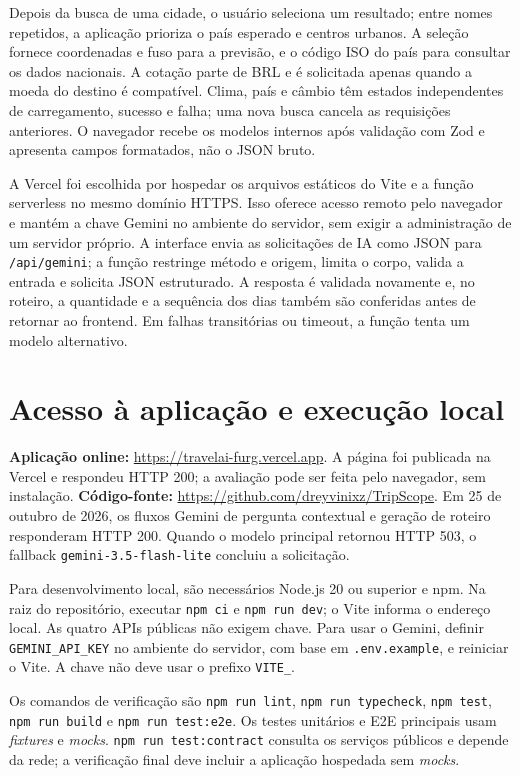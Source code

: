 \documentclass[a4paper,11pt]{article}
\begin{document}
\newpage
Depois da busca de uma cidade, o usuário seleciona um resultado; entre nomes repetidos, a aplicação prioriza o país esperado e centros urbanos. A seleção fornece coordenadas e fuso para a previsão, e o código ISO do país para consultar os dados nacionais. A cotação parte de BRL e é solicitada apenas quando a moeda do destino é compatível. Clima, país e câmbio têm estados independentes de carregamento, sucesso e falha; uma nova busca cancela as requisições anteriores. O navegador recebe os modelos internos após validação com Zod e apresenta campos formatados, não o JSON bruto.

A Vercel foi escolhida por hospedar os arquivos estáticos do Vite e a função serverless no mesmo domínio HTTPS. Isso oferece acesso remoto pelo navegador e mantém a chave Gemini no ambiente do servidor, sem exigir a administração de um servidor próprio. A interface envia as solicitações de IA como JSON para \texttt{/api/gemini}; a função restringe método e origem, limita o corpo, valida a entrada e solicita JSON estruturado. A resposta é validada novamente e, no roteiro, a quantidade e a sequência dos dias também são conferidas antes de retornar ao frontend. Em falhas transitórias ou timeout, a função tenta um modelo alternativo.

\section{Acesso à aplicação e execução local}
\textbf{Aplicação online:} \url{https://travelai-furg.vercel.app}. A página foi publicada na Vercel e respondeu HTTP 200; a avaliação pode ser feita pelo navegador, sem instalação. \textbf{Código-fonte:} \url{https://github.com/dreyvinixz/TripScope}. Em 25 de outubro de 2026, os fluxos Gemini de pergunta contextual e geração de roteiro responderam HTTP 200. Quando o modelo principal retornou HTTP 503, o fallback \texttt{gemini-3.5-flash-lite} concluiu a solicitação.

Para desenvolvimento local, são necessários Node.js 20 ou superior e npm. Na raiz do repositório, executar \texttt{npm ci} e \texttt{npm run dev}; o Vite informa o endereço local. As quatro APIs públicas não exigem chave. Para usar o Gemini, definir \texttt{GEMINI\_API\_KEY} no ambiente do servidor, com base em \texttt{.env.example}, e reiniciar o Vite. A chave não deve usar o prefixo \texttt{VITE\_}.

Os comandos de verificação são \texttt{npm run lint}, \texttt{npm run typecheck}, \texttt{npm test}, \texttt{npm run build} e \texttt{npm run test:e2e}. Os testes unitários e E2E principais usam \textit{fixtures} e \textit{mocks}. \texttt{npm run test:contract} consulta os serviços públicos e depende da rede; a verificação final deve incluir a aplicação hospedada sem \textit{mocks}.
\end{document}
